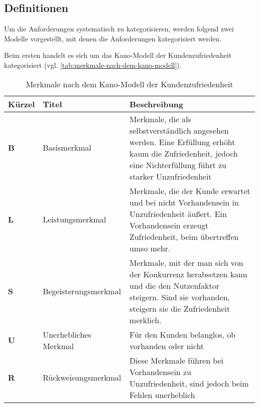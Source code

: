 	
\subsection{Definitionen}
	
Um die Anforderungen systematisch zu kategorisieren, werden folgend zwei Modelle vorgestellt, mit denen die Anforderungen kategorisiert werden.

Beim ersten handelt es sich um das Kano-Modell \cite{KanoModell} der Kundenzufriedenheit kategorisiert (vgl. \autoref{tab:merkmale-nach-dem-kano-modell}).
	
\begin{table}[H]
\begin{tabular}{ |p{1.2cm}|p{2.75cm}|p{9.55cm}| }
	\hline
	Kürzel & Titel & Beschreibung \\
	\hline
	\textbf{B} & Basis\-merkmal & Merkmale, die als selbstverständlich angesehen werden. Eine Erfüllung erhöht kaum die Zufriedenheit, jedoch eine Nichterfüllung führt zu starker Unzufriedenheit \\
	\hline
	\textbf{L} & Leistungs\-merkmal & Merkmale, die der Kunde erwartet und bei nicht Vorhandensein in Unzufriedenheit äußert. Ein Vorhandensein erzeugt Zufriedenheit, beim übertreffen umso mehr. \\
	\hline
	\textbf{S} & Begeisterungs\-merkmal & Merkmale, mit der man sich von der Konkurrenz herabsetzen kann und die den Nutzenfaktor steigern. Sind sie vorhanden, steigern sie die Zufriedenheit merklich. \\
	\hline
	\textbf{U} & Unerhebliches Merkmal & Für den Kunden belanglos, ob vorhanden oder nicht \\
	\hline
	\textbf{R} & Rückweisungs\-merkmal & Diese Merkmale führen bei Vorhandensein zu Unzufriedenheit, sind jedoch beim Fehlen unerheblich \\
	\hline
\end{tabular}
 \captionsetup{justification=centering}
  \caption{Merkmale nach dem Kano-Modell der Kundenzufriedenheit}
   \label{tab:merkmale-nach-dem-kano-modell}
\end{table}


